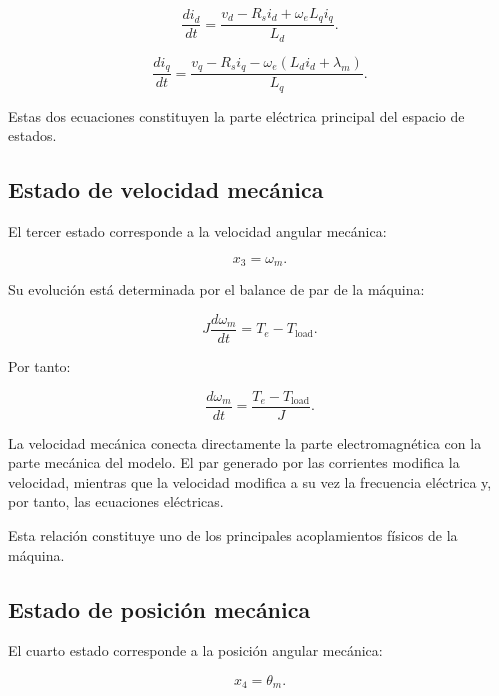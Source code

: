 \begin{equation}
\frac{di_d}{dt}
=
\frac{
v_d-R_si_d+\omega_eL_qi_q
}{
L_d
}.
\end{equation}

\begin{equation}
\frac{di_q}{dt}
=
\frac{
v_q-R_si_q-\omega_e(L_di_d+\lambda_m)
}{
L_q
}.
\end{equation}

Estas dos ecuaciones constituyen la parte eléctrica principal del espacio de estados.

\subsection{Estado de velocidad mecánica}

El tercer estado corresponde a la velocidad angular mecánica:

\begin{equation}
x_3=\omega_m.
\end{equation}

Su evolución está determinada por el balance de par de la máquina:

\begin{equation}
J\frac{d\omega_m}{dt}
=
T_e-T_{\mathrm{load}}.
\end{equation}

Por tanto:

\begin{equation}
\frac{d\omega_m}{dt}
=
\frac{
T_e-T_{\mathrm{load}}
}{
J
}.
\end{equation}

La velocidad mecánica conecta directamente la parte electromagnética con la parte mecánica del modelo. El par generado por las corrientes modifica la velocidad, mientras que la velocidad modifica a su vez la frecuencia eléctrica y, por tanto, las ecuaciones eléctricas.

Esta relación constituye uno de los principales acoplamientos físicos de la máquina.

\subsection{Estado de posición mecánica}

El cuarto estado corresponde a la posición angular mecánica:

\begin{equation}
x_4=\theta_m.
\end{equation}

